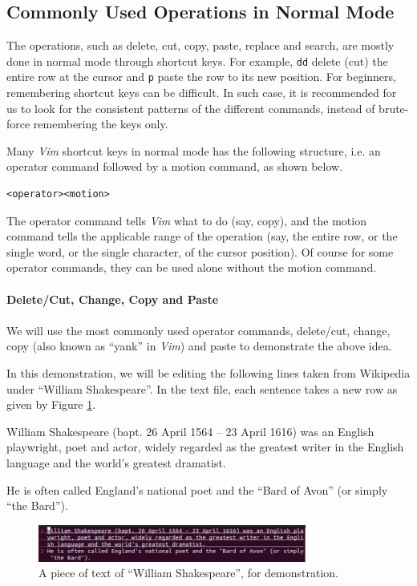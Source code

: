\subsection{Commonly Used Operations in Normal Mode}

The operations, such as delete, cut, copy, paste, replace and search, are mostly done in normal mode through shortcut keys. For example, \verb|dd| delete (cut) the entire row at the cursor and \verb|p| paste the row to its new position. For beginners, remembering shortcut keys can be difficult. In such case, it is recommended for us to look for the consistent patterns of the different commands, instead of brute-force remembering the keys only.

Many \textit{Vim} shortcut keys in normal mode has the following structure, i.e. an operator command followed by a motion command, as shown below.
\begin{verbatim}
<operator><motion>
\end{verbatim}
The operator command tells \textit{Vim} what to do (say, copy), and the motion command tells the applicable range of the operation (say, the entire row, or the single word, or the single character, of the cursor position). Of course for some operator commands, they can be used alone without the motion command.
\\
\\
\noindent \textbf{Delete/Cut, Change, Copy and Paste}
\\
\\
We will use the most commonly used operator commands, delete/cut, change, copy (also known as ``yank'' in \textit{Vim}) and paste to demonstrate the above idea.

In this demonstration, we will be editing the following lines taken from Wikipedia under ``William Shakespeare''. In the text file, each sentence takes a new row as given by Figure \ref{ch4fig:vimdemo1}.

\begin{shortbox}
William Shakespeare (bapt. 26 April 1564 – 23 April 1616) was an English playwright, poet and actor, widely regarded as the greatest writer in the English language and the world's greatest dramatist.

He is often called England's national poet and the ``Bard of Avon'' (or simply ``the Bard'').
\end{shortbox}

\begin{figure}
\centering
\includegraphics[width=250pt]{chapters/chapter4/figures/vimdemo1.png}
\caption{A piece of text of ``William Shakespeare'', for demonstration.} \label{ch4fig:vimdemo1}
\end{figure}


